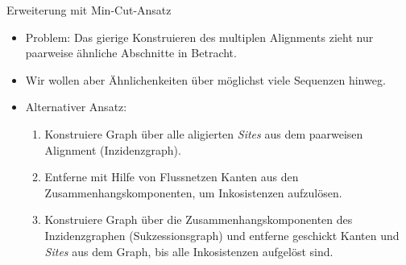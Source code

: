 \documentclass[wide,xcolor={x11names},hyperref={colorlinks=false},pantone312]{beamer}
\begin{document}
\begin{frame}[t]{Erweiterung mit Min-Cut-Ansatz}
	\begin{itemize}
		\item Problem: Das gierige Konstruieren des multiplen Alignments zieht nur paarweise ähnliche Abschnitte in Betracht. \cite{CPM10}
		\item Wir wollen aber Ähnlichenkeiten über möglichst viele Sequenzen hinweg. \pause
		\item Alternativer Ansatz: \\
		\begin{enumerate}
			\item Konstruiere Graph über alle aligierten \emph{Sites} aus dem paarweisen Alignment (Inzidenzgraph).
			\item Entferne mit Hilfe von Flussnetzen Kanten aus den Zusammenhangskomponenten, um Inkosistenzen aufzulösen.
			\item Konstruiere Graph über die Zusammenhangskomponenten des Inzidenzgraphen (Sukzessionsgraph) und entferne geschickt Kanten und \emph{Sites} aus dem Graph, bis alle Inkosistenzen aufgelöst sind.
		\end{enumerate}		
	\end{itemize}
\end{frame}
\end{document}
